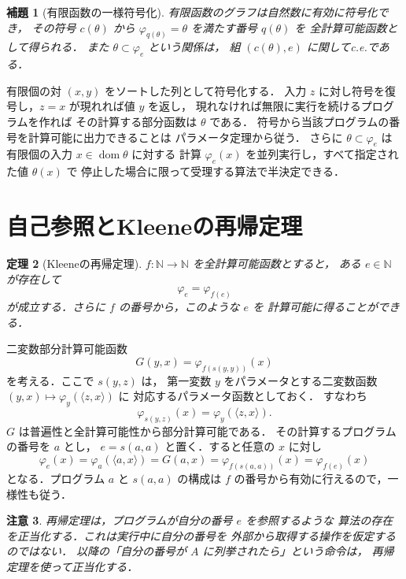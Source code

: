 \documentclass[a5paper,10pt,onecolumn]{jsarticle}
\makeatletter
\theoremstyle{mathnotetheorem}
\newtheorem{theorem}{定理}[section]
\newtheorem{lemma}[theorem]{補題}
\newtheorem{remark}[theorem]{注意}
\renewcommand{\proofname}{証明}
\renewenvironment{proof}[1][\proofname]{%
  \par\pushQED{\qed}\normalfont\topsep4\p@\@plus2\p@\relax
  \trivlist\item[\hskip\labelsep\bfseries #1]\ignorespaces
}{\popQED\endtrivlist\@endpefalse}
\makeatother
\begin{document}
\begin{lemma}[有限函数の一様符号化]\label{lem:finitecode}
有限函数のグラフは自然数に有効に符号化でき，
その符号 $c(\theta)$ から
$\varphi_{q(\theta)}=\theta$ を満たす番号 $q(\theta)$ を
全計算可能函数として得られる．
また $\theta\subset\varphi_e$ という関係は，
組 $(c(\theta),e)$ に関してc.e.である．
\end{lemma}
\begin{proof}
有限個の対 $(x,y)$ をソートした列として符号化する．
入力 $z$ に対し符号を復号し，$z=x$ が現れれば値 $y$ を返し，
現れなければ無限に実行を続けるプログラムを作れば
その計算する部分函数は $\theta$ である．
符号から当該プログラムの番号を計算可能に出力できることは
パラメータ定理から従う．
さらに $\theta\subset\varphi_e$ は
有限個の入力 $x\in\operatorname{dom}\theta$ に対する
計算 $\varphi_e(x)$ を並列実行し，すべて指定された値 $\theta(x)$ で
停止した場合に限って受理する算法で半決定できる．
\end{proof}

\section{自己参照とKleeneの再帰定理}
\begin{theorem}[Kleeneの再帰定理]\label{thm:rec}
$f:\mathbb N\to\mathbb N$ を全計算可能函数とすると，
ある $e\in\mathbb N$ が存在して
\[
 \varphi_e=\varphi_{f(e)}
\]
が成立する．さらに $f$ の番号から，このような $e$ を
計算可能に得ることができる．
\end{theorem}
\begin{proof}
二変数部分計算可能函数
\[
 G(y,x)=\varphi_{f(s(y,y))}(x)
\]
を考える．ここで $s(y,z)$ は，
第一変数 $y$ をパラメータとする二変数函数
$(y,x)\mapsto\varphi_y(\langle z,x\rangle)$ に
対応するパラメータ函数としておく．
すなわち
\[
 \varphi_{s(y,z)}(x)=\varphi_y(\langle z,x\rangle).
\]
$G$ は普遍性と全計算可能性から部分計算可能である．
その計算するプログラムの番号を $a$ とし，
$e=s(a,a)$ と置く．すると任意の $x$ に対し
\[
 \varphi_e(x)=\varphi_a(\langle a,x\rangle)
 =G(a,x)=\varphi_{f(s(a,a))}(x)
 =\varphi_{f(e)}(x)
\]
となる．プログラム $a$ と $s(a,a)$ の構成は
$f$ の番号から有効に行えるので，一様性も従う．
\end{proof}

\begin{remark}
再帰定理は，プログラムが自分の番号 $e$ を参照するような
算法の存在を正当化する．これは実行中に自分の番号を
外部から取得する操作を仮定するのではない．
以降の「自分の番号が $A$ に列挙されたら」という命令は，
再帰定理を使って正当化する．
\end{remark}
\end{document}
